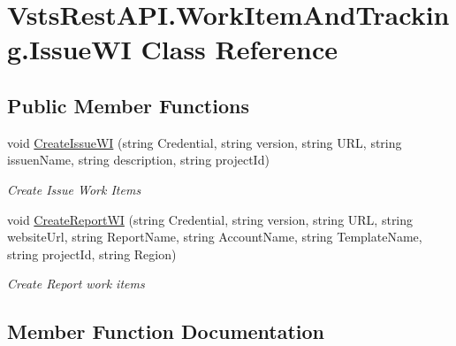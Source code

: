 \hypertarget{class_vsts_rest_a_p_i_1_1_work_item_and_tracking_1_1_issue_w_i}{}\section{Vsts\+Rest\+A\+P\+I.\+Work\+Item\+And\+Tracking.\+Issue\+WI Class Reference}
\label{class_vsts_rest_a_p_i_1_1_work_item_and_tracking_1_1_issue_w_i}
\subsection*{Public Member Functions}
\begin{DoxyCompactItemize}
\item 
void \mbox{\hyperlink{class_vsts_rest_a_p_i_1_1_work_item_and_tracking_1_1_issue_w_i_a58345bc764da664648c1fe6530405555}{Create\+Issue\+WI}} (string Credential, string version, string U\+RL, string issuen\+Name, string description, string project\+Id)
\begin{DoxyCompactList}\small\item\em Create Issue Work Items \end{DoxyCompactList}\item 
void \mbox{\hyperlink{class_vsts_rest_a_p_i_1_1_work_item_and_tracking_1_1_issue_w_i_a9e73160c28746c3b6090cfdc8d51b79f}{Create\+Report\+WI}} (string Credential, string version, string U\+RL, string website\+Url, string Report\+Name, string Account\+Name, string Template\+Name, string project\+Id, string Region)
\begin{DoxyCompactList}\small\item\em Create Report work items \end{DoxyCompactList}\end{DoxyCompactItemize}


\subsection{Member Function Documentation}
\mbox{\label{class_vsts_rest_a_p_i_1_1_work_item_and_tracking_1_1_issue_w_i_a58345bc764da664648c1fe6530405555}} 
